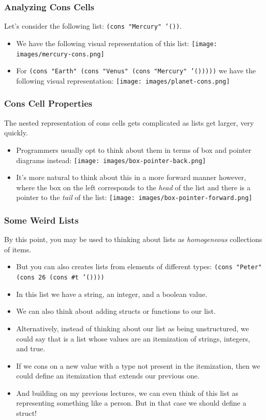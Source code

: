 \documentclass{beamer}
\begin{document}
\begin{frame}
  \frametitle{Analyzing Cons Cells}
  Let's consider the following list: \texttt{(cons "Mercury" '())}.
  \begin{itemize}
  \item<2-> We have the following visual representation of this list:
    \texttt{[image: images/mercury-cons.png]}
  \item<3-> For \texttt{(cons "Earth" (cons "Venus" (cons "Mercury" '()))))}
    we have the following visual representation:
    \texttt{[image: images/planet-cons.png]}
  \end{itemize}
\end{frame}

\begin{frame}
  \frametitle{Cons Cell Properties}
  The nested representation of cons cells gets complicated as lists get larger, very quickly.
  \begin{itemize}
  \item<2-> Programmers usually opt to think about them in terms of box and pointer diagrams instead:
    \texttt{[image: images/box-pointer-back.png]}
  \item<3-> It's more natural to think about this in a more forward manner however, where the box on the
    left corresponds to the \emph{head} of the list and there is a pointer to the \emph{tail} of the list:
    \texttt{[image: images/box-pointer-forward.png]}
  \end{itemize}
\end{frame}

\begin{frame}
  \frametitle{Some Weird Lists}
  By this point, you may be used to thinking about lists as \emph{homogeneous} collections of items.
  \begin{itemize}
  \item<2-> But you can also creates lists from elements of different types:
    \texttt{(cons "Peter" (cons 26 (cons \#t '())))}
  \item<3-> In this list we have a string, an integer, and a boolean value.
  \item<4-> We can also think about adding structs or functions to our list.
  \item<5-> Alternatively, instead of thinking about our list as being unstructured,
    we could say that is a list whose values are an itemization of strings, integers, and true.
  \item<6-> If we cons on a new value with a type not present in the itemization, then we could define
    an itemization that extends our previous one.
  \item<7-> And building on my previous lectures, we can even think of this list as representing
    something like a person. But in that case we should define a struct!
  \end{itemize}
\end{frame}
\end{document}
